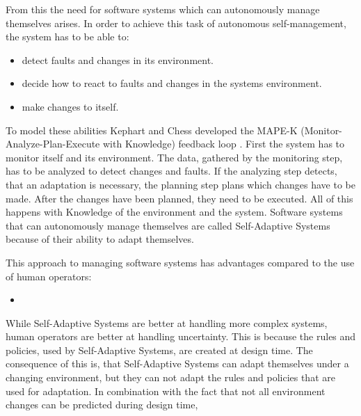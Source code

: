 From this the need for software systems which can autonomously manage themselves arises.
In order to achieve this task of autonomous self-management, the system has to be able to:
\begin{itemize}
    \item detect faults and changes in its environment.
    \item decide how to react to faults and changes in the systems environment.
    \item make changes to itself.
\end{itemize}
To model these abilities Kephart and Chess developed 
the MAPE-K (Monitor-Analyze-Plan-Execute with Knowledge) feedback loop \cite*{VisionOfAutonomicComputing}.
\newline
First the system has to monitor itself and its environment. 
The data, gathered by the monitoring step, has to be analyzed to detect changes and faults.
If the analyzing step detects, that an adaptation is necessary, 
the planning step plans which changes have to be made.
After the changes have been planned, they need to be executed.
All of this happens with Knowledge of the environment and the system.
\newline
Software systems that can autonomously manage themselves are called Self-Adaptive Systems
because of their ability to adapt themselves.
\newline
\par


This approach to managing software systems has advantages compared to the use of human operators:
\begin{itemize}%
    \item 
\end{itemize}

While Self-Adaptive Systems are better at handling more complex systems,
human operators are better at handling uncertainty.
\newline
This is because the rules and policies, used by Self-Adaptive Systems,
are created at design time.
The consequence of this is, that Self-Adaptive Systems can adapt themselves under a changing environment,
but they can not adapt the rules and policies that are used for adaptation.
In combination with the fact that not all environment changes can be predicted during design time,


